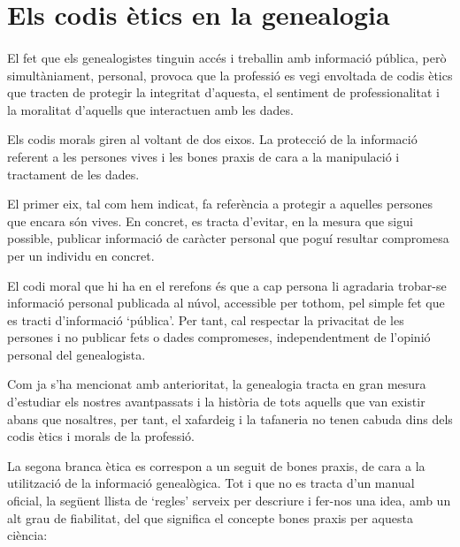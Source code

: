 \section{Els codis ètics en la genealogia}

    \paragraph{}
    El fet que els genealogistes tinguin accés i treballin amb informació pública, però simultàniament, personal, provoca que la professió es vegi envoltada de codis ètics que tracten de protegir la integritat d'aquesta, el sentiment de professionalitat i la moralitat d'aquells que interactuen amb les dades.

    Els codis morals giren al voltant de dos eixos. La protecció de la informació referent a les persones vives i les bones praxis de cara a la manipulació i tractament de les dades.

    El primer eix, tal com hem indicat, fa referència a protegir a aquelles persones que encara són vives. En concret, es tracta d'evitar, en la mesura que sigui possible, publicar informació de caràcter personal que poguí resultar compromesa per un individu en concret.

    El codi moral que hi ha en el rerefons és que a cap persona li agradaria trobar-se informació personal publicada al núvol, accessible per tothom, pel simple fet que es tracti d'informació `pública'. Per tant, cal respectar la privacitat de les persones i no publicar fets o dades compromeses, independentment de l'opinió personal del genealogista.

    Com ja s'ha mencionat amb anterioritat, la genealogia tracta en gran mesura d'estudiar els nostres avantpassats i la història de tots aquells que van existir abans que nosaltres, per tant, el xafardeig i la tafaneria no tenen cabuda dins dels codis ètics i morals de la professió.

    La segona branca ètica es correspon a un seguit de bones praxis, de cara a la utilització de la informació genealògica. Tot i que no es tracta d'un manual oficial, la següent llista de `regles' serveix per descriure i fer-nos una idea, amb un alt grau de fiabilitat, del que significa el concepte bones praxis per aquesta ciència:

